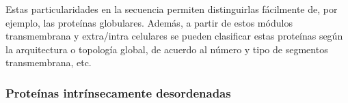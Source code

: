 Estas particularidades en la secuencia permiten distinguirlas fácilmente de, por ejemplo, las proteínas globulares. 
Además, a partir de estos módulos transmembrana y extra/intra celulares se pueden clasificar estas proteínas según la arquitectura o topología global, de acuerdo al número y tipo de segmentos transmembrana, etc.



















\subsubsection{Proteínas intrínsecamente desordenadas}



% 





